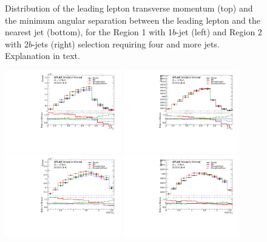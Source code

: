 \begin{figure}[!htb]
  \caption{Distribution of the leading lepton transverse momentum (top) and the minimum angular separation between the leading lepton and the nearest jet (bottom), for the Region 1 with 1$b$-jet (left) and Region 2 with 2$b$-jets (right) selection requiring four and more jets. Explanation in text.
  \label{ttV:lep_kin}}
\end{figure}

\begin{figure}[!htb]
\centering
\includegraphics[width=0.45\textwidth]{Plots/ttV/c_Region_0_DRll01}
\includegraphics[width=0.45\textwidth]{Plots/ttV/c_Region_1_DRll01}\\
\includegraphics[width=0.45\textwidth]{Plots/ttV/c_Region_0_maxEta_ll} 
\includegraphics[width=0.45\textwidth]{Plots/ttV/c_Region_1_maxEta_ll}\\

\end{figure}

